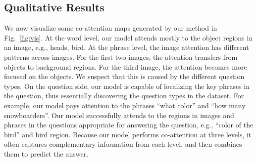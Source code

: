 \documentclass{article}
\begin{document}
\subsection{Qualitative Results}
We now visualize some co-attention maps generated by our method in Fig.~\ref{fig:vis}. At the word level, our model attends mostly to the object regions in an image, e.g., heads, bird. At the phrase level, the image attention has different patterns across images. For the first two images, the attention transfers from objects to background regions. For the third image, the attention becomes more focused on the objects. We suspect that this is caused by the different question types. On the question side, our model is capable of localizing the key phrases in the question, thus essentially discovering the question types in the dataset. For example, our model pays attention to the phrases ``what color'' and ``how many snowboarders''. Our model successfully attends to the regions in images and phrases in the questions appropriate for answering the question, e.g., ``color of the bird'' and bird region.  Because our model performs co-attention at three levels, it often captures complementary information from each level, and then combines them to predict the answer.
\end{document}
